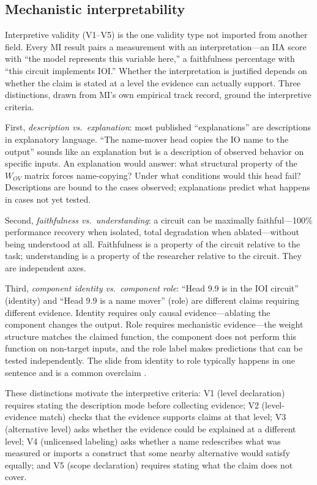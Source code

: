 \documentclass{article}
\begin{document}
\subsection{Mechanistic interpretability}
\label{sec:mi-lens}

Interpretive validity (V1--V5) is the one validity type not imported from another field. Every MI result pairs a measurement with an interpretation---an IIA score with ``the model represents this variable here,'' a faithfulness percentage with ``this circuit implements IOI.'' Whether the interpretation is justified depends on whether the claim is stated at a level the evidence can actually support. Three distinctions, drawn from MI's own empirical track record, ground the interpretive criteria.

First, \emph{description vs.\ explanation}: most published ``explanations'' are descriptions in explanatory language. ``The name-mover head copies the IO name to the output'' sounds like an explanation but is a description of observed behavior on specific inputs. An explanation would answer: what structural property of the $W_{OV}$ matrix forces name-copying? Under what conditions would this head fail? Descriptions are bound to the cases observed; explanations predict what happens in cases not yet tested.

Second, \emph{faithfulness vs.\ understanding}: a circuit can be maximally faithful---100\% performance recovery when isolated, total degradation when ablated---without being understood at all. Faithfulness is a property of the circuit relative to the task; understanding is a property of the researcher relative to the circuit. They are independent axes.

Third, \emph{component identity vs.\ component role}: ``Head 9.9 is in the IOI circuit'' (identity) and ``Head 9.9 is a name mover'' (role) are different claims requiring different evidence. Identity requires only causal evidence---ablating the component changes the output. Role requires mechanistic evidence---the weight structure matches the claimed function, the component does not perform this function on non-target inputs, and the role label makes predictions that can be tested independently. The slide from identity to role typically happens in one sentence and is a common overclaim \citep{wang2023interpretability}.

These distinctions motivate the interpretive criteria: V1 (level declaration) requires stating the description mode before collecting evidence; V2 (level-evidence match) checks that the evidence supports claims at that level; V3 (alternative level) asks whether the evidence could be explained at a different level; V4 (unlicensed labeling) asks whether a name redescribes what was measured or imports a construct that some nearby alternative would satisfy equally; and V5 (scope declaration) requires stating what the claim does not cover.
\end{document}
